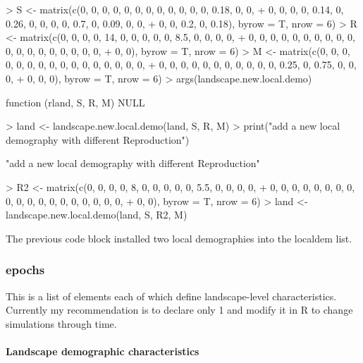 \documentclass[10pt]{article}
\begin{document}
\begin{Schunk}
\begin{Sinput}
> S <- matrix(c(0, 0, 0, 0, 0, 0, 0, 0, 0, 0, 0, 0, 0.18, 0, 0, 
+     0, 0, 0, 0, 0.14, 0, 0.26, 0, 0, 0, 0, 0.7, 0, 0.09, 0, 0, 
+     0, 0, 0.2, 0, 0.18), byrow = T, nrow = 6)
> R <- matrix(c(0, 0, 0, 0, 14, 0, 0, 0, 0, 0, 8.5, 0, 0, 0, 0, 
+     0, 0, 0, 0, 0, 0, 0, 0, 0, 0, 0, 0, 0, 0, 0, 0, 0, 0, 0, 
+     0, 0), byrow = T, nrow = 6)
> M <- matrix(c(0, 0, 0, 0, 0, 0, 0, 0, 0, 0, 0, 0, 0, 0, 0, 0, 
+     0, 0, 0, 0, 0, 0, 0, 0, 0, 0, 0, 0.25, 0, 0.75, 0, 0, 0, 
+     0, 0, 0), byrow = T, nrow = 6)
> args(landscape.new.local.demo)
\end{Sinput}
\begin{Soutput}
function (rland, S, R, M) 
NULL
\end{Soutput}
\begin{Sinput}
> land <- landscape.new.local.demo(land, S, R, M)
> print("add a new local demography with different Reproduction")
\end{Sinput}
\begin{Soutput}
[1] "add a new local demography with different Reproduction"
\end{Soutput}
\begin{Sinput}
> R2 <- matrix(c(0, 0, 0, 0, 8, 0, 0, 0, 0, 0, 5.5, 0, 0, 0, 0, 
+     0, 0, 0, 0, 0, 0, 0, 0, 0, 0, 0, 0, 0, 0, 0, 0, 0, 0, 0, 
+     0, 0), byrow = T, nrow = 6)
> land <- landscape.new.local.demo(land, S, R2, M)
\end{Sinput}
\end{Schunk}

The previous code block installed two local demographies into the localdem list.

\subsubsection{epochs}
\label{sec:epochs}
This is a list of elements each of which define landscape-level
characteristics.  Currently my recommendation is to declare only 1 and
modify it in R to change simulations through time.

\paragraph{Landscape demographic characteristics}
\label{sec:landc-demogr-char}
\end{document}
